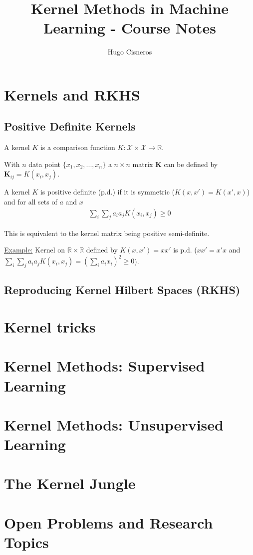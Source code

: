 \documentclass{article}
\title{Kernel Methods in Machine Learning - Course Notes}
\author{Hugo Cisneros}
\date{}
\begin{document}
\maketitle

\section{Kernels and RKHS}

\subsection{Positive Definite Kernels}

A kernel $K$ is  a comparison function $K: \mathcal{X}\times\mathcal{X}
 \rightarrow \mathbb{R}$.

With $n$ data point $\{x_1, x_2, ..., x_n\}$ a $n \times n$ matrix $\mathbf{K}$
can be defined by $\mathbf{K}_{ij} = K(x_i, x_j)$.

A kernel $K$ is positive definite (p.d.) if it is symmetric ($K(x, x') = 
K(x', x)$) and for all sets of $a$ and $x$
\begin{align*}
    \sum_i\sum_j a_i a_j K(x_i, x_j) \geq 0
\end{align*}

This is equivalent to the kernel matrix being positive semi-definite. 

\underline{Example:} Kernel on $\mathbb{R}\times\mathbb{R}$  defined by 
$K(x, x') = xx'$ is p.d. ($xx' = x'x$ and $ \sum_i\sum_j a_i a_j K(x_i, x_j) = 
\left(\sum_i a_i x_i\right)^2 \geq 0$).

\subsection{Reproducing Kernel Hilbert Spaces (RKHS)}

\section{Kernel tricks}

\section{Kernel Methods: Supervised Learning}

\section{Kernel Methods: Unsupervised Learning}

\section{The Kernel Jungle}

\section{Open Problems and Research Topics}
\end{document}
